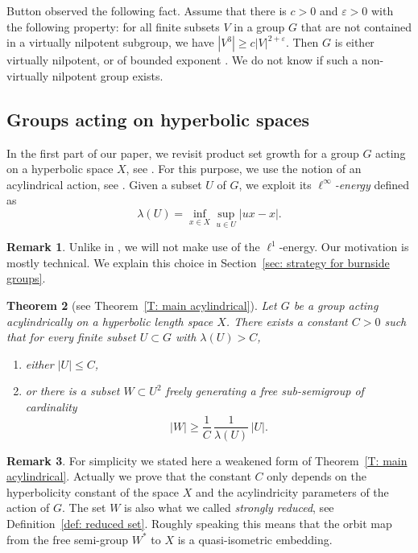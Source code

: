 \documentclass[JEP,XML,SOM,Unicode, NoEqCountersInSection,published]{cedram}
\theoremstyle{plain}
\newtheorem{thm}{Theorem}[section]
\theoremstyle{definition}
\newtheorem{rem}[thm]{Remark}
\begin{document}
Button observed the following fact.
Assume that there is $c>0$ and $\varepsilon>0$ with the following property: for all finite subsets $V$ in a group $G$ that are not contained in a virtually nilpotent subgroup, we have $|V^3|\geqslant c |V|^{2+\varepsilon}$.
Then $G$ is either virtually nilpotent, or of bounded exponent \cite[Prop.\,4.1]{button_explicit_2013}.
We do not know if such a non-virtually nilpotent group exists.

\subsection{Groups acting on hyperbolic spaces}
In the first part of our paper, we revisit product set growth for a group $G$ acting on a hyperbolic space $X$, see \cite[Th.\,1.14]{delzant_product_2020}. For this purpose, we use the notion of an acylindrical action, see \cite{sela_acylindricity_1997,bowditch_tight_2008}.
Given a subset $U$ of $G$, we exploit its \emph{$\ell^\infty$-energy} defined as
\begin{equation*}
\lambda(U) = \inf_{x \in X}\sup_{u \in U} |ux - x|.
\end{equation*}

\begin{rem}
Unlike in \cite{delzant_product_2020}, we will not make use of the $\ell^1$-energy.
Our motivation is mostly technical.
We explain this choice in Section~\ref{sec: strategy for burnside groups}.
\end{rem}

\begin{thm}[see Theorem~\ref{T: main acylindrical}]
\label{T: main acylindrical - intro}
Let $G$ be a group acting acylindrically on a hyperbolic length space $X$.
There exists a constant $C > 0$ such that for every finite subset $U\subset G$ with $\lambda(U)> C$,
\begin{enumerate}
\item either $\displaystyle |U| \leq C$,
\item or there is a subset $W\subset U^2$ freely generating a free sub-semigroup of cardinality
\begin{equation*}
|W| \geq \frac 1C\,\frac 1{\lambda(U)}\, |U|.
\end{equation*}
\end{enumerate}
\end{thm}

\begin{rem}
For simplicity we stated here a weakened form of Theorem~\ref{T: main acylindrical}.
Actually we prove that the constant $C$ only depends on the hyperbolicity constant of the space $X$ and the acylindricity parameters of the action of $G$.
The set $W$ is also what we called \emph{strongly reduced}, see Definition~\ref{def: reduced set}.
Roughly speaking this means that the orbit map from the free semi-group $W^*$ to $X$ is a quasi-isometric embedding.
\end{rem}
\end{document}
